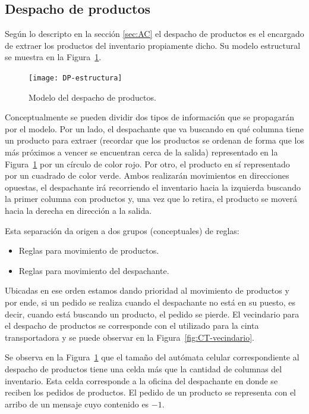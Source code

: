 \documentclass[10pt]{article}
\begin{document}
\subsection{Despacho de productos}\label{sec:DP}
Según lo descripto en la sección \ref{sec:AC} el despacho de productos es el encargado de extraer los productos del inventario propiamente dicho.
Su modelo estructural se muestra en la Figura~\ref{fig:DP-estructura}.

\begin{figure}[h] 
	\centering 
	\texttt{[image: DP-estructura]} 
	\caption{Modelo del despacho de productos.} 
	\label{fig:DP-estructura} 
\end{figure}

Conceptualmente se pueden dividir dos tipos de información que se propagarán por el modelo. Por un lado, el despachante que va buscando en qué columna tiene un producto para extraer (recordar que los productos se ordenan de forma que los más próximos a vencer se encuentran cerca de la salida) representado en la Figura~\ref{fig:DP-estructura} por un círculo de color rojo. Por otro, el producto en sí representado por un cuadrado de color verde. Ambos realizarán movimientos en direcciones opuestas, el despachante irá recorriendo el inventario hacia la izquierda buscando la primer columna con productos y, una vez que lo retira, el producto se moverá hacia la derecha en dirección a la salida. 

Esta separación da origen a dos grupos (conceptuales) de reglas:
\begin{itemize}
	\item Reglas para movimiento de productos.
	\item Reglas para movimiento del despachante.
\end{itemize}

Ubicadas en ese orden estamos dando prioridad al movimiento de productos y por ende, si un pedido se realiza cuando el despachante no está en su puesto, es decir, cuando está buscando un producto, el pedido se pierde. El vecindario para el despacho de productos se corresponde con el utilizado para la cinta transportadora y se puede observar en la Figura~\ref{fig:CT-vecindario}. 

Se observa en la Figura~\ref{fig:DP-estructura} que el tamaño del autómata celular correspondiente al despacho de productos tiene una celda más que la cantidad de columnas del inventario. Esta celda corresponde a la oficina del despachante en donde se reciben los pedidos de productos. El pedido de un producto se representa con el arribo de un mensaje cuyo contenido es $-1$.
\end{document}
